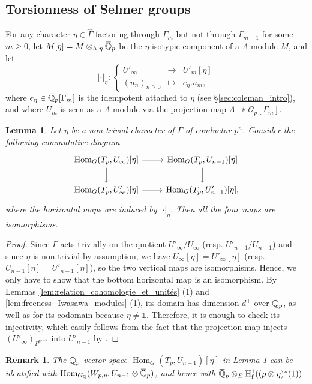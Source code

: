 \documentclass[12pt]{amsart}
\newcommand\bQ{\mathbb{Q}}
\newcommand\cO{\mathcal{O}}
\newcommand{\ob}[1]{\mkern 1.5mu\overline{\mkern-1.5mu#1\mkern-1.5mu}\mkern 1.5mu}
\DeclareMathOperator{\Hom}{Hom}
\newcommand{\HH}{\mathrm{H}}
\newcommand{\ff}{\mathrm{f}}
\theoremstyle{defstyle}
\newtheorem{remark}[subsubsection]{Remark}
\theoremstyle{thmstyle}
\newtheorem{lemme}[subsubsection]{Lemma}
\begin{document}
\subsection{Torsionness of Selmer groups}\label{sec:torsionness_Sel}
For any character $\eta \in \widehat{\Gamma}$ factoring through ${\Gamma}_{m}$ but not through $\Gamma_{m-1}$ for some $m\geq 0$, let $M[\eta]=M \otimes_{\Lambda,\eta} \ob{\bQ}_p$ be the $\eta$-isotypic component of a $\Lambda$-module $M$, and let
$$|\cdot|_\eta : \left\{\begin{array}{ccc}
U'_\infty &\longrightarrow& U'_m[\eta] \\
(u_n)_{n\geq 0} &\mapsto & e_\eta . u_m,
\end{array}\right.$$
where $e_\eta \in \ob{\bQ}_p[\Gamma_m]$ is the idempotent attached to $\eta$ (see \S\ref{sec:coleman_intro}), and where $U_m$ is seen as a $\Lambda$-module via the projection map $\Lambda \twoheadrightarrow \cO_p[\Gamma_m]$.
\begin{lemme}\label{lem:eta-spécialisation_unités}
	Let $\eta$ be a non-trivial character of $\Gamma$ of conductor $p^n$. Consider the following commutative diagram
	$$\begin{tikzcd}
	\Hom_G(T_p,U_\infty)[\eta] \dar\rar & \Hom_G(T_p,U_{n-1})[\eta] \dar \\ 
	\Hom_G(T_p,U'_\infty)[\eta] \rar & \Hom_G(T_p,U'_{n-1})[\eta],
	\end{tikzcd}$$
	where the horizontal maps are induced by $|\cdot|_\eta$. Then all the four maps are isomorphisms.
\end{lemme}
\begin{proof} Since $\Gamma$ acts trivially on the quotient $U'_\infty/U_\infty$ (resp. $U'_{n-1}/U_{n-1}$) and since $\eta$ is non-trivial by assumption, we have $U_\infty[\eta]=U'_\infty[\eta]$ (resp. $U_{n-1}[\eta]=U'_{n-1}[\eta]$), so the two vertical maps are isomorphisms. Hence, we only have to show that the bottom horizontal map is an isomorphism. By Lemmas \ref{lem:relation_cohomologie_et_unités} (1) and \ref{lem:freeness_Iwasawa_modules} (1), its domain has dimension $d^+$ over $\ob{\bQ}_p$, as well as for its codomain because $\eta \neq \mathds{1}$. Therefore, it is enough to check its injectivity, which easily follows from the fact that the projection map injects $(U'_\infty)_{\Gamma^{p^{n-1}}}$ into $U'_{n-1}$ by \cite[Thm. 7.3]{kuzmin}. 
\end{proof}
\begin{remark}\label{rem:target_eta_proj}
	The $\ob{\bQ}_p$-vector space $\Hom_G(T_p,U_{n-1})[\eta]$ in Lemma \ref{lem:eta-spécialisation_unités} can be identified with $\Hom_{G_{\bQ}}(W_{p,\eta},U_{n-1} \otimes \ob{\bQ}_p)$, and hence with $\ob{\bQ}_p \otimes_E \HH^1_\ff((\rho \otimes \eta)^*(1))$.
\end{remark}
\end{document}
